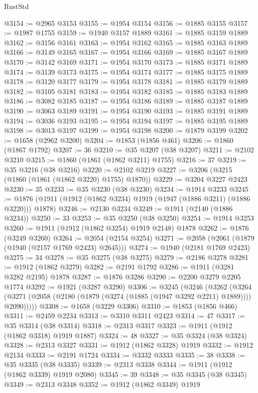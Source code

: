 \begin{lexlean}{RustStd}
\begin{coremodule}
{\begin{coremodule}
{{{{{{{{{{{{{{{{{{{{{{{{{{{{{@3154 := @2965 @3153
@3155 := @1954 @3154
@3156 := @1885 @3155
@3157 := @1987 @1755
@3159 := @1940 @3157 @1889
@3161 := @1885 @3159 @1889
@3162 := @3156 @3161
@3163 := @1954 @3162
@3165 := @1885 @3163 @1889
@3166 := @3149 @3165
@3167 := @1954 @3166
@3169 := @1885 @3167 @1889
@3170 := @3142 @3169
@3171 := @1954 @3170
@3173 := @1885 @3171 @1889
@3174 := @3139 @3173
@3175 := @1954 @3174
@3177 := @1885 @3175 @1889
@3178 := @3120 @3177
@3179 := @1954 @3178
@3181 := @1885 @3179 @1889
@3182 := @3105 @3181
@3183 := @1954 @3182
@3185 := @1885 @3183 @1889
@3186 := @3082 @3185
@3187 := @1954 @3186
@3189 := @1885 @3187 @1889
@3190 := @3063 @3189
@3191 := @1954 @3190
@3193 := @1885 @3191 @1889
@3194 := @3036 @3193
@3195 := @1954 @3194
@3197 := @1885 @3195 @1889
@3198 := @3013 @3197
@3199 := @1954 @3198
@3200 := @1879 @3199
@3202 := @1658 (@2962 @3200)
@3204 := @1853 (@1856 @461)
@3206 := @1860 (@1867 @1792)
@3207 := 36
@3210 := @35 @3207 (@38 @3207)
@3211 := @2102 @3210
@3215 := @1860 (@1861 (@1862 @3211) @1755)
@3216 := 37
@3219 := @35 @3216 (@38 @3216)
@3220 := @2102 @3219
@3227 := @3206 (@3215 (@1860 (@1861 (@1862 @3220) @1755) @1870))
@3229 := @3204 @3227 @2423
@3230 := 35
@3233 := @35 @3230 (@38 @3230)
@3234 := @1914 @3233
@3245 := @1876 (@1911 (@1912 (@1862 @3234) @1919 (@1947 (@1886 @3211) (@1886 @3220))) @1878)
@3246 := @2130 @3234
@3249 := @1911 (@2140 (@1886 @3234))
@3250 := 33
@3253 := @35 @3250 (@38 @3250)
@3254 := @1914 @3253
@3260 := @1911 (@1912 (@1862 @3254) @1919 @2148) @1878
@3262 := @1876 (@3249 @3260)
@3264 := @2054 (@2154 @3254)
@3271 := @2058 (@2061 (@1879 (@1940 (@2157 @1769 @2423) @2645)))
@3274 := @1940 (@2181 @1769 @2423)
@3275 := 34
@3278 := @35 @3275 (@38 @3275)
@3279 := @2186 @3278
@3281 := @1912 (@1862 @3279)
@3282 := @2191 @1792
@3286 := @1911 (@3281 @3282 @2195) @1878
@3287 := @1876 @3286
@3290 := @2200 @3279 @2205 @1774
@3292 := @1921 (@3287 @3290)
@3306 := @3245
    (@3246
      (@3262
        (@3264 (@3271 (@2058 (@2180 (@1879 (@3274 (@1885 (@1947 @3292 @2211) @1889)))) @2090)))))
@3308 := @1658 (@3229 @3306)
@3310 := @1853 (@1856 @466)
@3311 := @2459 @2234
@3313 := @3310 @3311 @2423
@3314 := 47
@3317 := @35 @3314 (@38 @3314)
@3318 := @2313 @3317
@3323 := @1911 (@1912 (@1862 @3318) @1919 @1887)
@3324 := 48
@3327 := @35 @3324 (@38 @3324)
@3328 := @2313 @3327
@3331 := @1912 (@1862 @3328) @1919
@3332 := @1912 @2134
@3333 := @2191 @1724
@3334 := @3332 @3333
@3335 := 38
@3338 := @35 @3335 (@38 @3335)
@3339 := @2313 @3338
@3344 := @1911 (@1912 (@1862 @3339) @1919 @2080)
@3345 := 39
@3348 := @35 @3345 (@38 @3345)
@3349 := @2313 @3348
@3352 := @1912 (@1862 @3349) @1919
}}}}}}}}}}}}}}}}}}}}}}}}}}}}}
\end{coremodule}}
\end{coremodule}
\end{lexlean}
